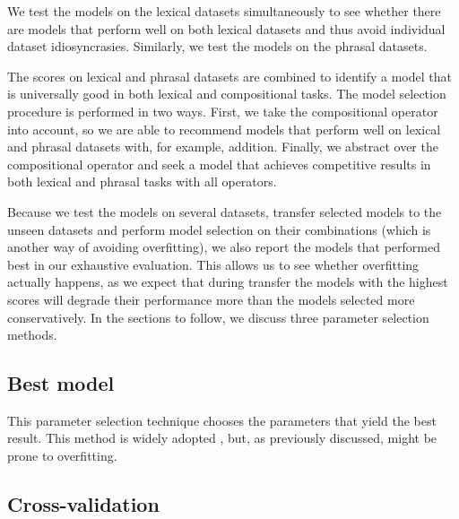 We test the models on the lexical datasets simultaneously to see whether there are models that perform well on both lexical datasets and thus avoid individual dataset idiosyncrasies. Similarly, we test the models on the phrasal datasets.

The scores on lexical and phrasal datasets are combined to identify a model that is universally good in both lexical and compositional tasks. The model selection procedure is performed in two ways. First, we take the compositional operator into account, so we are able to recommend models that perform well on lexical and phrasal datasets with, for example, addition. Finally, we abstract over the compositional operator and seek a model that achieves competitive results in both lexical and phrasal tasks with all operators.
%

Because we test the models on several datasets, transfer selected models to the unseen datasets and perform model selection on their combinations (which is another way of avoiding overfitting), we also report the models that performed best in our exhaustive evaluation. This allows us to see whether overfitting actually happens, as we expect that during transfer the models with the highest scores will degrade their performance more than the models selected more conservatively. In the sections to follow, we discuss three parameter selection methods.

\subsection{Best model}

This parameter selection technique chooses the parameters that yield the best result. This method is widely adopted \cite{mitchell-lapata:2008:ACLMain,Grefenstette:2011:ESC:2145432.2145580,milajevs-purver:2014:CVSC,milajevs-EtAl:2014:EMNLP2014}, but, as previously discussed, might be prone to overfitting.
%
%

\subsection{Cross-validation}

